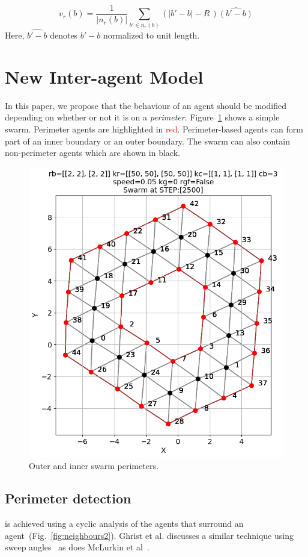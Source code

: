 \documentclass[12pt,a4paper]{IEEEtran}
\newcommand{\card}[1]{\vert{#1}\vert}
\newcommand{\vbb}[2]{#2-#1}
\begin{document}
\begin{equation}\label{eq:repulsion2a}
v_r(b) = \frac{1}{\card{n_r(b)}}\sum_{b' \in n_r(b)} \left(\card{\vbb{b}{b'}} - R \, \right)\widehat{\left(\vbb{b}{b'}\right)}
\end{equation}
Here, $\widehat{\vbb{b}{b'}}$ denotes $\vbb{b}{b'}$ normalized to unit length.

\section{New Inter-agent Model}
In this paper, we propose that the behaviour of an agent should be modified depending on whether or not it is on a \emph{perimeter}. Figure~\ref{fig:simplePerim2} shows a simple swarm. Perimeter agents are highlighted in \textcolor{red}{red}. Perimeter-based agents can form part of an inner boundary or an outer boundary. The swarm can also contain non-perimeter agents which are shown in black.

\begin{figure}[H]
	\begin{center}
		\includegraphics[width=0.8\linewidth]{figures/relationships2}
	\end{center}
	\caption{Outer and inner swarm perimeters. \label{fig:simplePerim2}}
\end{figure}

\subsection{Perimeter detection}\label{sec:perimeterDetection} is achieved using a cyclic analysis of the agents that surround an agent~(Fig.~\ref{fig:neighbours2}). Ghrist et al. discusses a similar technique using sweep angles~\cite{ghrist2008surrounding} as does McLurkin et al~\cite{mclurkin2009}. 
\end{document}
